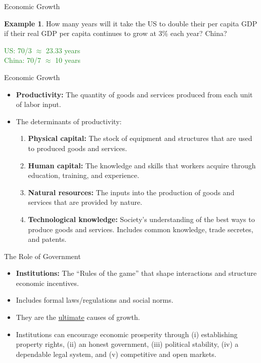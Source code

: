 \documentclass[xcolor={dvipsnames},pdf, hyperref={colorlinks=true, citecolor=ForestGreen, linkcolor=BlueViolet, urlcolor=Magenta}]{beamer}
\theoremstyle{definition}
\newtheorem{exmp}{Example}[section]
\newcommand{\defn}[1]{\textbf{#1}}
\newcommand{\ddp}[1]{{\textcolor{ForestGreen}{#1}}}
\begin{document}
\begin{frame}{Economic Growth}
\begin{exmp}
	How many years will it take the US to double their per capita GDP if their real GDP per capita continues to grow at 3\% each year? China?
\end{exmp}
\ddp{\pause US: 70/3 $\approx$ 23.33 years \\
	\pause China: 70/7 $\approx$ 10 years}
\end{frame}

\begin{frame}{Economic Growth}
\begin{itemize}
	\item \defn{Productivity:} The quantity of goods and services produced from each unit of labor input.
	\item The determinants of productivity:
	\begin{enumerate}
		\item \defn{Physical capital:} The stock of equipment and structures that are used to produced goods and services.
		\item \defn{Human capital:} The knowledge and skills that workers acquire through education, training, and experience.
		\item \defn{Natural resources:} The inputs into the production of goods and services that are provided by nature.
		\item \defn{Technological knowledge:} Society's understanding of the best ways to produce goods and services. Includes common knowledge, trade secretes, and patents.
	\end{enumerate}
\end{itemize}
\end{frame}

\begin{frame}{The Role of Government}
\begin{itemize}
	\item \defn{Institutions:} The ``Rules of the game'' that shape interactions and structure economic incentives. 
	\item Includes formal laws/regulations and social norms. 
	\item They are the \underline{ultimate} causes of growth.
	\item Institutions can encourage economic prosperity through (i) establishing property rights, (ii) an honest government, (iii) political stability, (iv) a dependable legal system, and (v) competitive and open markets.
\end{itemize}
\end{frame}
\end{document}
